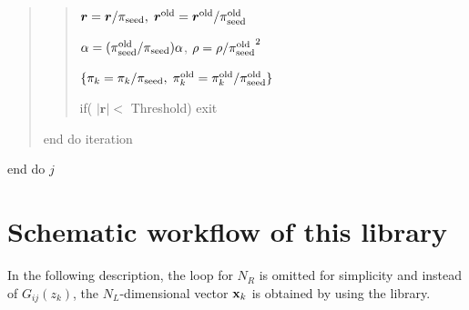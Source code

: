 \documentclass[letterpaper,10pt,dvipdfmx,openany]{sphinxmanual}
\begin{document}
\begin{quote}
\begin{quote}
\({\boldsymbol r} = {\boldsymbol r} / \pi_{\rm seed},\; {\boldsymbol r}^{\rm old} = {\boldsymbol r}^{\rm old} / \pi_{\rm seed}^{\rm old}\)

\(\alpha = (\pi_{\rm seed}^{\rm old} / \pi_{\rm seed}) \alpha\), \(\rho = \rho / {\pi_{\rm seed}^{\rm old}}^2\)

\(\{\pi_k = \pi_k/\pi_{\rm seed},\; \pi_k^{\rm old} = \pi_k^{\rm old}/\pi_{\rm seed}^{\rm old}\}\)

if( \(|{\boldsymbol r}| <\) Threshold) exit
\end{quote}

end do iteration
\end{quote}

end do \(j\)


\chapter{Schematic workflow of this library}
\label{komega_workflow_en:schematic-workflow-of-this-library}\label{komega_workflow_en::doc}
In the following description, the loop for \(N_R\) is omitted for
simplicity and instead of \(G_{i j}(z_k)\),
the \(N_L\)-dimensional vector \({\bf x}_{k}\)
is obtained by using the library.
\end{document}
